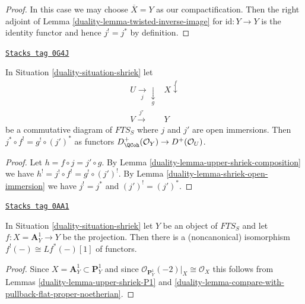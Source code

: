 \begin{proof}

In this case we may choose $\overline{X} = Y$ as our compactification.
Then the
right adjoint of Lemma \ref{duality-lemma-twisted-inverse-image} for
$\text{id} : Y \to Y$ is the
identity functor and hence $j^! = j^*$ by definition.
\end{proof}

\begin{lemma}
\label{duality-lemma-restrict-before-or-after}
\href{https://stacks.math.columbia.edu/tag/0G4J}{\texttt{Stacks tag 0G4J}}

In Situation \ref{duality-situation-shriek} let
$$
\begin{array}{cc}U \underset{j}{\longrightarrow}\underset{g}{\downarrow} & X \overset{f}{\downarrow} \\ V \overset{j'}{\longrightarrow} & Y\end{array}
$$
be a commutative diagram of $\textit{FTS}_S$ where $j$ and $j'$ are
open immersions. Then $j^* \circ f^! = g^! \circ (j')^*$ as functors
$D^+_\QCoh(\mathcal{O}_Y) \to D^+(\mathcal{O}_U)$.
\end{lemma}

\begin{proof}

Let $h = f \circ j = j' \circ g$. By
Lemma \ref{duality-lemma-upper-shriek-composition} we have
$h^! = j^! \circ f^! = g^! \circ (j')^!$. By
Lemma \ref{duality-lemma-shriek-open-immersion}
we have $j^! = j^*$ and $(j')^! = (j')^*$.
\end{proof}

\begin{lemma}
\label{duality-lemma-shriek-affine-line}
\href{https://stacks.math.columbia.edu/tag/0AA1}{\texttt{Stacks tag 0AA1}}

In Situation \ref{duality-situation-shriek} let $Y$ be an object of $\textit{FTS}_S$
and let $f : X = \mathbf{A}^1_Y \to Y$ be
the projection. Then there is a (noncanonical) isomorphism
$f^!(-) \cong Lf^*(-) [1]$ of functors.
\end{lemma}

\begin{proof}

Since $X = \mathbf{A}^1_Y \subset \mathbf{P}^1_Y$
and since $\mathcal{O}_{\mathbf{P}^1_Y}(-2)|_X \cong \mathcal{O}_X$
this follows from Lemmas \ref{duality-lemma-upper-shriek-P1} and
\ref{duality-lemma-compare-with-pullback-flat-proper-noetherian}.
\end{proof}

